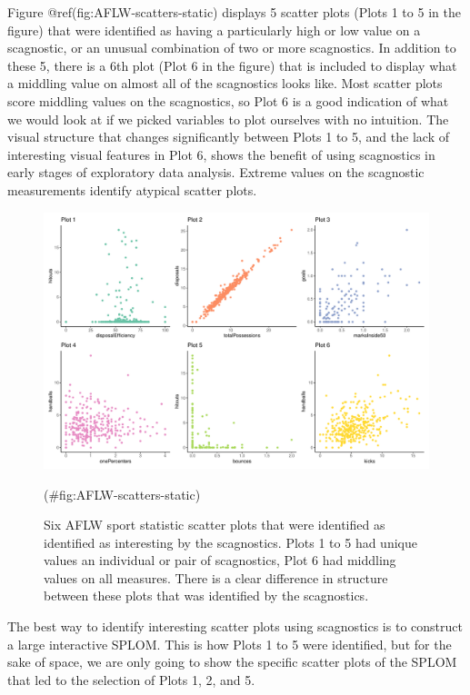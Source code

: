 Figure @ref(fig:AFLW-scatters-static) displays 5 scatter plots (Plots 1
to 5 in the figure) that were identified as having a particularly high
or low value on a scagnostic, or an unusual combination of two or more
scagnostics. In addition to these 5, there is a 6th plot (Plot 6 in the
figure) that is included to display what a middling value on almost all
of the scagnostics looks like. Most scatter plots score middling values
on the scagnostics, so Plot 6 is a good indication of what we would look
at if we picked variables to plot ourselves with no intuition. The
visual structure that changes significantly between Plots 1 to 5, and
the lack of interesting visual features in Plot 6, shows the benefit of
using scagnostics in early stages of exploratory data analysis. Extreme
values on the scagnostic measurements identify atypical scatter plots.

\begin{Schunk}
\begin{figure}

{\centering \includegraphics[width=0.8\linewidth]{mason-lee-laa-cook_files/figure-latex/AFLW-scatters-static-1} 

}

\caption[Six AFLW sport statistic scatter plots that were identified as identified as interesting by the scagnostics]{Six AFLW sport statistic scatter plots that were identified as identified as interesting by the scagnostics. Plots 1 to 5 had unique values an individual or pair of scagnostics, Plot 6 had middling values on all measures. There is a clear difference in structure between these plots that was identified by the scagnostics.}(\#fig:AFLW-scatters-static)
\end{figure}
\end{Schunk}

The best way to identify interesting scatter plots using scagnostics is
to construct a large interactive SPLOM. This is how Plots 1 to 5 were
identified, but for the sake of space, we are only going to show the
specific scatter plots of the SPLOM that led to the selection of Plots
1, 2, and 5.

